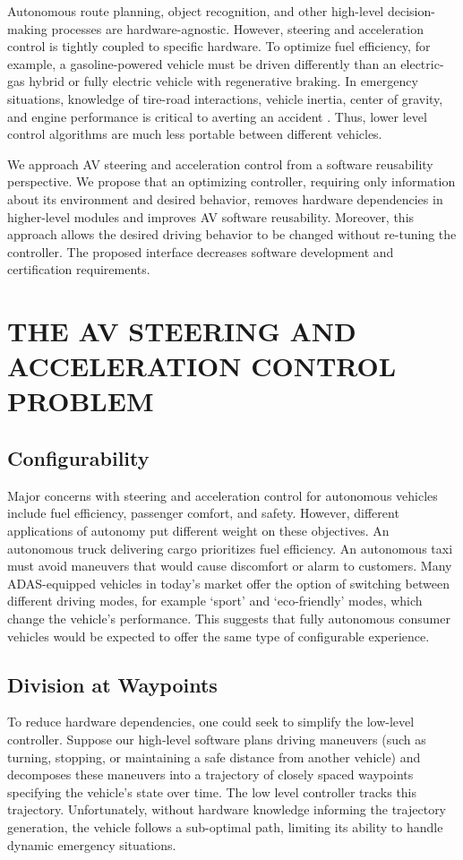 \documentclass[letterpaper, 10 pt, conference]{ieeeconf}  %
\begin{document}
Autonomous route planning, object recognition, and other high-level decision-making processes are hardware-agnostic. However, steering and acceleration control is tightly coupled to specific hardware. To optimize fuel efficiency, for example, a gasoline-powered vehicle must be driven differently than an electric-gas hybrid or fully electric vehicle with regenerative braking. In emergency situations, knowledge of tire-road interactions, vehicle inertia, center of gravity, and engine performance is critical to averting an accident \cite{beal}. Thus, lower level control algorithms are much less portable between different vehicles.

We approach AV steering and acceleration control from a software reusability perspective. We propose that an optimizing controller, requiring only information about its environment and desired behavior, removes hardware dependencies in higher-level modules and improves AV software reusability. Moreover, this approach allows the desired driving behavior to be changed without re-tuning the controller. The proposed interface decreases software development and certification requirements.


\section{THE AV STEERING AND ACCELERATION CONTROL PROBLEM}
\subsection{Configurability}
Major concerns with steering and acceleration control for autonomous vehicles include fuel efficiency, passenger comfort, and safety. However, different applications of autonomy put different weight on these objectives. An autonomous truck delivering cargo prioritizes fuel efficiency. An autonomous taxi must avoid maneuvers that would cause discomfort or alarm to customers. Many ADAS-equipped vehicles in today's market offer the option of switching between different driving modes, for example `sport' and `eco-friendly' modes, which change the vehicle's performance. This suggests that fully autonomous consumer vehicles would be expected to offer the same type of configurable experience.


\subsection{Division at Waypoints}

To reduce hardware dependencies, one could seek to simplify the low-level controller. Suppose our high-level software plans driving maneuvers (such as turning, stopping, or maintaining a safe distance from another vehicle) and decomposes these maneuvers into a trajectory of closely spaced waypoints specifying the vehicle's state over time. The low level controller tracks this trajectory. Unfortunately, without hardware knowledge informing the trajectory generation, the vehicle follows a sub-optimal path, limiting its ability to handle dynamic emergency situations.
\end{document}
